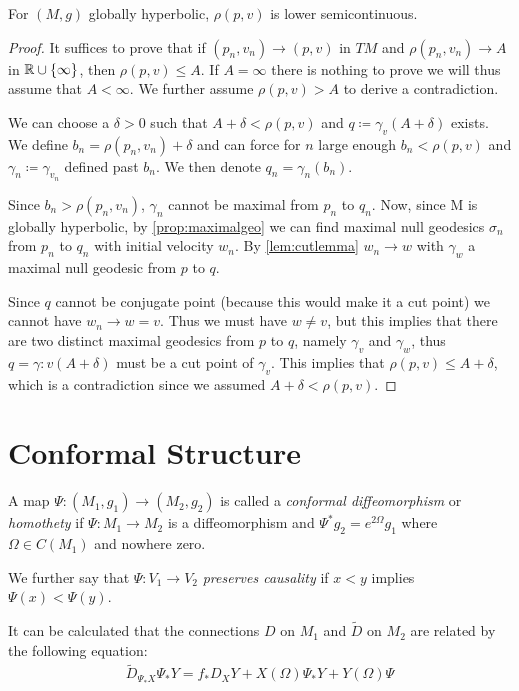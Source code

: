\begin{proposition}\label{prop:rhosemicont}
For $(M,g)$ globally hyperbolic, $\rho(p,v)$ is lower semicontinuous.
\end{proposition}
\begin{proof}It suffices to prove that if $(p_n,v_n)\to(p,v)$ in $TM$ and $\rho(p_n,v_n)\to A$ in $\mathbb{R} \cup \{\infty\}$, then $\rho(p,v)\leq A$. If $A=\infty$ there is nothing to prove we will thus assume that $A<\infty$. We further assume $\rho(p,v)>A$ to derive a contradiction.

We can choose a $\delta>0$ such that $A+\delta<\rho(p,v)$ and $q\coloneqq\gamma_v(A+\delta)$ exists.
We define $b_n = \rho(p_n,v_n)+\delta$ and can force for $n$ large enough $b_n<\rho(p,v)$ and $\gamma_n\coloneqq\gamma_{v_n}$ defined past $b_n$. We then denote $q_n = \gamma_n(b_n)$.  

Since $b_n>\rho(p_n,v_n)$, $\gamma_n$ cannot be maximal from $p_n$ to $q_n$. 
Now, since M is globally hyperbolic, by \ref{prop:maximalgeo} we can find maximal null geodesics $\sigma_n$ from $p_n$ to $q_n$ with initial velocity $w_n$. By \ref{lem:cutlemma} $w_n\to w$ with $\gamma_w$ a maximal null geodesic from $p$ to $q$. 

Since $q$ cannot be conjugate point (because this would make it a cut point) we cannot have $w_n\to w = v$. Thus we must have $w\neq v$, but this implies that there are two distinct maximal geodesics from $p$ to $q$, namely $\gamma_v$ and $\gamma_w$, thus $q=\gamma:v(A+\delta)$ must be a cut point of $\gamma_v$. This implies that $\rho(p,v)\leq A + \delta$, which is a contradiction since we assumed $A+\delta<\rho(p,v)$.
\end{proof}



\section{Conformal Structure}
\begin{definition}
A map $\Psi:(M_1,g_1)\to(M_2,g_2)$ is called a \emph{conformal diffeomorphism} or \emph{homothety} if $\Psi:M_1\to M_2$ is a diffeomorphism and $\Psi^*g_2=e^{2\Omega}g_1$ where $\Omega\in C(M_1)$ and nowhere zero.

We further say that $\Psi:V_1\to V_2$ \emph{preserves causality} if $x<y$ implies $\Psi(x)<\Psi(y)$.
\end{definition}

It can be calculated that the connections $D$ on $M_1$ and $\widetilde{D}$ on $M_2$ are related by the following equation:
\begin{align}
    \widetilde{D}_{\Psi_*X}\Psi_*Y = f_*D_XY + X(\Omega)\Psi_*Y + Y(\Omega)\Psi
\end{align}

